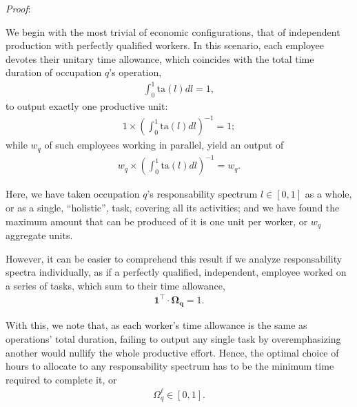 \documentclass[hidelinks, nonatbib]{elsarticle}
\begin{document}
\begin{enumerate}
    \textit{Proof}:

    We begin with the most trivial of economic configurations, that of independent production with perfectly qualified workers. In this scenario, each employee devotes their unitary time allowance, which coincides with the total time duration of occupation $q$'s operation,
    \begin{gather}
        \int_{0}^{1}{
            \text{ta}(l)
            dl
        }
        =
        1
        ,
    \end{gather}
    to output exactly one productive unit:
    \begin{gather}
        1
        \times
        \left(
            \int_{0}^{1}{
                \text{ta}(l)dl
            }
        \right) ^ {-1}
        =
        1
        ;
    \end{gather}
    while $w_q$ of such employees working in parallel, yield an output of
    \begin{align}
        w_q 
        \times 
        \left(
            \int_{0}^{1}{
                \text{ta}(l)dl
            }
        \right) ^ {-1}
        =
        w_q
        .
    \end{align}

    Here, we have taken occupation $q$'s responsability spectrum $l \in [0,1]$ as a whole, or as a single, ``holistic'', task, covering all its activities; and we have found the maximum amount that can be produced of it is one unit per worker, or $w_q$ aggregate units.

    However, it can be easier to comprehend this result if we analyze responsability spectra individually, as if a perfectly qualified, independent, employee worked on a series of tasks, which sum to their time allowance,
    \begin{gather}
        \boldsymbol{1} ^ {\top}
        \cdot
        \boldsymbol{\Omega_{q}}
        = 
        1
        .
    \end{gather}
    
    With this, we note that, as each worker's time allowance is the same as operations' total duration, failing to output any single task by overemphasizing another would nullify the whole productive effort. Hence, the optimal choice of hours to allocate to any responsability spectrum has to be the minimum time required to complete it, or
    \begin{gather}
        \Omega_{q}^{\ell} 
        \in
        [0,1]
        .
    \end{gather}


\end{enumerate}
\end{document}
